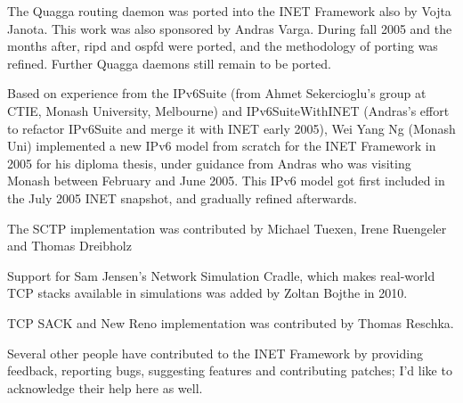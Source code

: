 The Quagga routing daemon was ported into the INET Framework also by Vojta
Janota. This work was also sponsored by Andras Varga. During fall 2005 and
the months after, ripd and ospfd were ported, and the methodology of porting
was refined. Further Quagga daemons still remain to be ported.

Based on experience from the IPv6Suite (from Ahmet Sekercioglu's group at
CTIE, Monash University, Melbourne) and IPv6SuiteWithINET (Andras's effort
to refactor IPv6Suite and merge it with INET early 2005), Wei Yang Ng
(Monash Uni) implemented a new IPv6 model from scratch for the
INET Framework in 2005 for his diploma thesis, under guidance from Andras
who was visiting Monash between February and June 2005. This IPv6 model
got first included in the July 2005 INET snapshot, and gradually refined
afterwards.

The SCTP implementation was contributed by Michael Tuexen, Irene Ruengeler
and Thomas Dreibholz

Support for Sam Jensen's Network Simulation Cradle,
which makes real-world TCP stacks available in simulations was added
by Zoltan Bojthe in 2010.

TCP SACK and New Reno implementation was contributed by Thomas Reschka.

Several other people have contributed to the INET Framework by providing
feedback, reporting bugs, suggesting features and contributing patches;
I'd like to acknowledge their help here as well.




